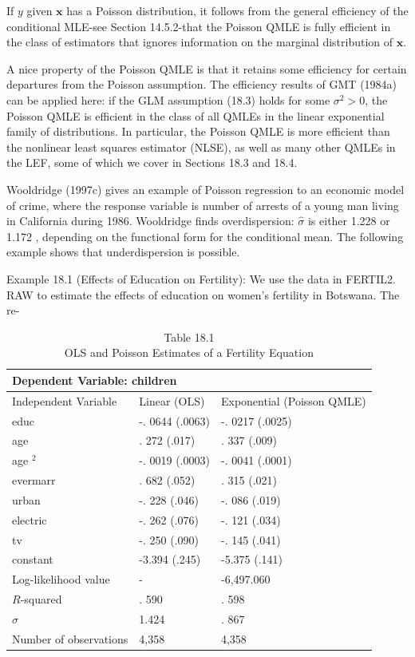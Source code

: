 \documentclass[10pt]{article}
\begin{document}
If $y$ given $\mathbf{x}$ has a Poisson distribution, it follows from the general efficiency of the conditional MLE-see Section 14.5.2-that the Poisson QMLE is fully efficient in the class of estimators that ignores information on the marginal distribution of $\mathbf{x}$.

A nice property of the Poisson QMLE is that it retains some efficiency for certain departures from the Poisson assumption. The efficiency results of GMT (1984a) can be applied here: if the GLM assumption (18.3) holds for some $\sigma^{2}>0$, the Poisson QMLE is efficient in the class of all QMLEs in the linear exponential family of distributions. In particular, the Poisson QMLE is more efficient than the nonlinear least squares estimator (NLSE), as well as many other QMLEs in the LEF, some of which we cover in Sections 18.3 and 18.4.

Wooldridge (1997c) gives an example of Poisson regression to an economic model of crime, where the response variable is number of arrests of a young man living in California during 1986. Wooldridge finds overdispersion: $\hat{\sigma}$ is either 1.228 or 1.172 , depending on the functional form for the conditional mean. The following example shows that underdispersion is possible.

Example 18.1 (Effects of Education on Fertility): We use the data in FERTIL2. RAW to estimate the effects of education on women's fertility in Botswana. The re-

\begin{table}[h]
\begin{center}
\captionsetup{labelformat=empty}
\caption{Table 18.1\\
OLS and Poisson Estimates of a Fertility Equation}
\begin{tabular}{|l|l|l|}
\hline
\multicolumn{3}{|l|}{Dependent Variable: children} \\
\hline
Independent Variable & Linear (OLS) & Exponential (Poisson QMLE) \\
\hline
educ & -. 0644 (.0063) & -. 0217 (.0025) \\
\hline
age & . 272 (.017) & . 337 (.009) \\
\hline
age ${ }^{2}$ & -. 0019 (.0003) & -. 0041 (.0001) \\
\hline
evermarr & . 682 (.052) & . 315 (.021) \\
\hline
urban & -. 228 (.046) & -. 086 (.019) \\
\hline
electric & -. 262 (.076) & -. 121 (.034) \\
\hline
tv & -. 250 (.090) & -. 145 (.041) \\
\hline
constant & -3.394 (.245) & -5.375 (.141) \\
\hline
Log-likelihood value & - & -6,497.060 \\
\hline
$R$-squared & . 590 & . 598 \\
\hline
$\hat{\sigma}$ & 1.424 & . 867 \\
\hline
Number of observations & 4,358 & 4,358 \\
\hline
\end{tabular}
\end{center}
\end{table}
\end{document}
